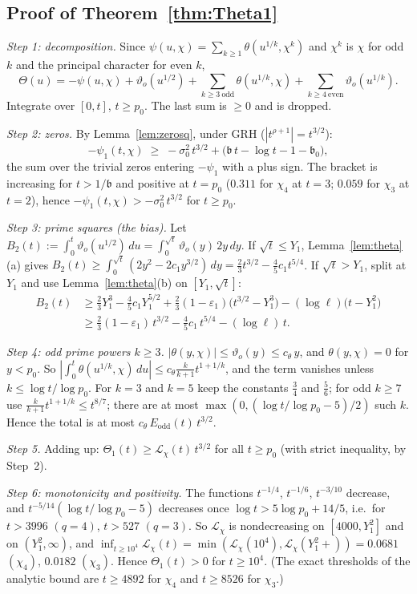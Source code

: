 \documentclass[11pt]{amsart}
\theoremstyle{definition}
\numberwithin{equation}{section}
\newcommand{\eps}{\varepsilon}
\newcommand{\cL}{\mathcal L}          %
\newcommand{\vth}{\vartheta_{o}}      %
\begin{document}
\subsection{Proof of Theorem~\ref{thm:Theta1}}

\emph{Step 1: decomposition.} Since
$\psi(u,\chi)=\sum_{k\ge1}\theta(u^{1/k},\chi^k)$ and $\chi^k$ is
$\chi$ for odd $k$ and the principal character for even $k$,
\[
\Theta(u)=-\psi(u,\chi)+\vth(u^{1/2})
+\sum_{k\ge3\ \mathrm{odd}}\theta(u^{1/k},\chi)
+\sum_{k\ge4\ \mathrm{even}}\vth(u^{1/k}).
\]
Integrate over $[0,t]$, $t\ge p_0$. The last sum is $\ge0$ and is
dropped.

\emph{Step 2: zeros.} By Lemma~\ref{lem:zerosq}, under GRH
($|t^{\rho+1}|=t^{3/2}$):
\[
-\psi_1(t,\chi)\;\ge\;-\sigma_0^2\,t^{3/2}
+\bigl(\mathfrak b\,t-\log t-1-\mathfrak b_0\bigr),
\]
the sum over the trivial zeros entering $-\psi_1$ with a plus sign.
The bracket is increasing for $t>1/\mathfrak b$ and positive at
$t=p_0$ ($0.311$ for $\chi_4$ at $t=3$; $0.059$ for $\chi_3$ at
$t=2$), hence $-\psi_1(t,\chi)>-\sigma_0^2\,t^{3/2}$ for $t\ge p_0$.

\emph{Step 3: prime squares (the bias).} Let
$B_2(t):=\int_0^t\vth(u^{1/2})\,du=\int_0^{\sqrt t}\vth(y)\,2y\,dy$.
If $\sqrt t\le Y_1$, Lemma~\ref{lem:theta}(a) gives
$B_2(t)\ge\int_0^{\sqrt t}(2y^2-2c_1y^{3/2})\,dy
=\tfrac23t^{3/2}-\tfrac45c_1t^{5/4}$. If $\sqrt t>Y_1$, split at
$Y_1$ and use Lemma~\ref{lem:theta}(b) on $[Y_1,\sqrt t]$:
\begin{align*}
B_2(t)&\ge\tfrac23Y_1^3-\tfrac45c_1Y_1^{5/2}
+\tfrac23(1-\eps_1)\bigl(t^{3/2}-Y_1^3\bigr)-(\log\ell)\bigl(t-Y_1^2\bigr)\\
&\ge\tfrac23(1-\eps_1)\,t^{3/2}-\tfrac45c_1\,t^{5/4}-(\log\ell)\,t .
\end{align*}

\emph{Step 4: odd prime powers $k\ge3$.}
$|\theta(y,\chi)|\le\vth(y)\le c_\theta\,y$, and $\theta(y,\chi)=0$
for $y<p_0$. So
$|\int_0^t\theta(u^{1/k},\chi)\,du|\le c_\theta\frac{k}{k+1}t^{1+1/k}$,
and the term vanishes unless $k\le\log t/\log p_0$. For $k=3$ and
$k=5$ keep the constants $\tfrac34$ and $\tfrac56$; for odd $k\ge7$
use $\frac{k}{k+1}t^{1+1/k}\le t^{8/7}$; there are at most
$\max(0,(\log t/\log p_0-5)/2)$ such $k$. Hence the total is at most
$c_\theta\,E_{\mathrm{odd}}(t)\,t^{3/2}$.

\emph{Step 5.} Adding up:
$\Theta_1(t)\ge\cL_\chi(t)\,t^{3/2}$ for all $t\ge p_0$ (with strict
inequality, by Step~2).

\emph{Step 6: monotonicity and positivity.} The functions $t^{-1/4}$,
$t^{-1/6}$, $t^{-3/10}$ decrease, and
$t^{-5/14}(\log t/\log p_0-5)$ decreases once
$\log t>5\log p_0+14/5$, i.e.\ for $t>3996$ $(q=4)$, $t>527$
$(q=3)$. So $\cL_\chi$ is nondecreasing on $[4000,Y_1^2]$ and on
$(Y_1^2,\infty)$, and
$\inf_{t\ge10^4}\cL_\chi(t)=\min(\cL_\chi(10^4),\cL_\chi(Y_1^2+))
=0.0681$ $(\chi_4)$, $0.0182$ $(\chi_3)$. Hence $\Theta_1(t)>0$ for
$t\ge10^4$. (The exact thresholds of the analytic bound are
$t\ge4892$ for $\chi_4$ and $t\ge8526$ for $\chi_3$.)
\end{document}
